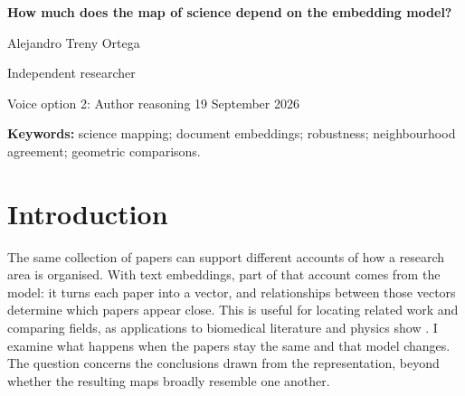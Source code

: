 \documentclass[12pt]{article}
\begin{document}
\begin{center}
{\LARGE\bfseries How much does the map of science depend on the embedding model?\par}
\vspace{12pt}
{\large Alejandro Treny Ortega\par}
\smallskip
Independent researcher\par
\medskip
{\small Voice option 2: Author reasoning \textbullet{} 19 September 2026\par}
\end{center}

\begin{abstract}
Changing an embedding model changes the representation of scientific papers. The question is which conclusions change with it. I compare ten models on a fixed corpus of 500,000 OpenAlex records from 26 fields and 2000--2024, using matched panels to examine field centres, internal structure and nearest neighbours, alongside input and representation choices. The models share broad structure but retain only 30.3\% of the 25 nearest neighbours on average within field-period groups. Removing abstracts changes neighbours about as much as changing models; removing titles changes less. A later exploratory analysis of all 325 field pairs finds persistent opposite orderings across models in 262 pairs for angular spread and 221 for effective linear dimension. Requiring relative differences above 5\% leaves 96 and 177. Alternative measures retain many oppositions, with further dependence on centring and pooling. A field comparison can therefore survive repeated article selection while reversing between models. These findings describe geometry, without establishing thematic correctness. I argue that robustness should be assessed at the level of the claim made from a science map: overall agreement can coexist with disagreement on the comparison that matters.
\end{abstract}
\textbf{Keywords:} science mapping; document embeddings; robustness; neighbourhood agreement; geometric comparisons.

\section{Introduction}
The same collection of papers can support different accounts of how a research area is organised. With text embeddings, part of that account comes from the model: it turns each paper into a vector, and relationships between those vectors determine which papers appear close. This is useful for locating related work and comparing fields, as applications to biomedical literature and physics show \citep{refbe130e2973,refc0e2cc29e0}. I examine what happens when the papers stay the same and that model changes. The question concerns the conclusions drawn from the representation, beyond whether the resulting maps broadly resemble one another.
\end{document}
